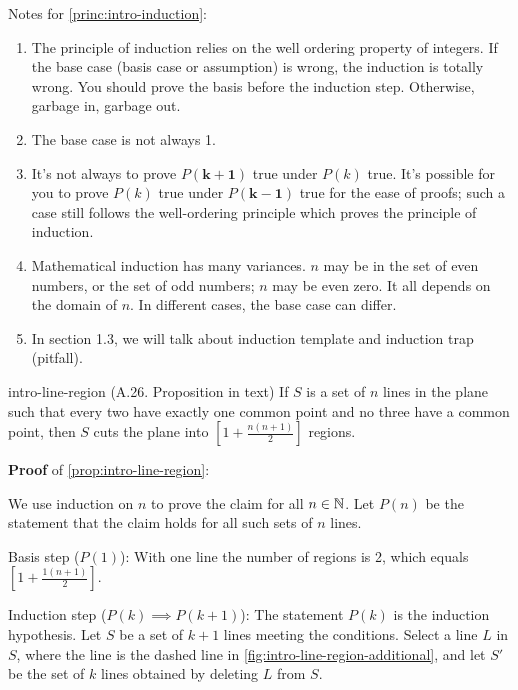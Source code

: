 \documentclass[../src/handouts/main.tex]{subfiles}
\begin{document}
Notes for \cref{princ:intro-induction}:
\begin{enumerate}
  \item The principle of induction relies on the well ordering property of integers. If the base case (basis case or assumption) is wrong, the induction is totally wrong. You should prove the basis before the induction step. Otherwise, garbage in, garbage out.
  \item The base case is not always 1.
  \item It's not always to prove $P(\bm{k + 1})$ true under $P(k)$ true. It's possible for you to prove $P(k)$ true under $P(\bm{k - 1})$ true for the ease of proofs; such a case still follows the well-ordering principle which proves the principle of induction.
  \item Mathematical induction has many variances. $n$ may be in the set of even numbers, or the set of odd numbers; $n$ may be even zero. It all depends on the domain of $n$. In different cases, the base case can differ.
  \item In section 1.3, we will talk about induction template and induction trap (pitfall).  %
\end{enumerate}

\begin{proposition}{}{intro-line-region}
  (A.26. Proposition in text)
  If $S$ is a set of $n$ lines in the plane such that every two have exactly one common point and no three have a common point, then $S$ cuts the plane into $\left[ 1 + \frac{n (n + 1)}{2} \right]$ regions.
\end{proposition}

\textbf{Proof} of \cref{prop:intro-line-region}:

We use induction on $n$ to prove the claim for all $n \in \mathbb{N}$.
Let $P(n)$ be the statement that the claim holds for all such sets of $n$ lines.

Basis step ($P(1)$): With one line the number of regions is 2, which equals $\left[ 1 + \frac{1 (n + 1)}{2} \right]$.

Induction step ($P(k) \implies P(k + 1)$): The statement $P(k)$ is the induction hypothesis. Let $S$ be a set of $k + 1$ lines meeting the conditions. Select a line $L$ in $S$, where the line is the dashed line in \cref{fig:intro-line-region-additional}, and let $S'$ be the set of $k$ lines obtained by deleting $L$ from $S$.
\end{document}

